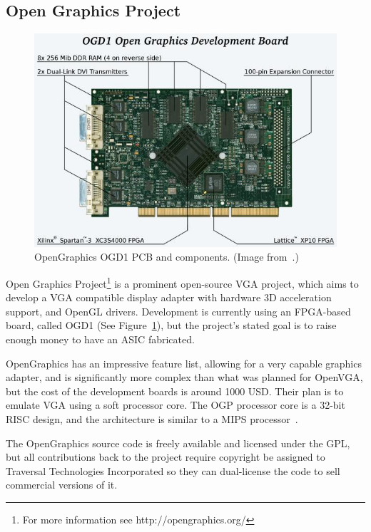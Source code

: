 \subsection{Open Graphics Project}

\begin{figure}[h!]
\begin{center}
\includegraphics[width=\linewidth]{images/ogd1_showcase.jpeg}
\end{center}
\caption[OpenGraphics OGD1]{OpenGraphics OGD1 PCB and components. (Image
from~\cite{OpenGraphics}.)}
\label{INTRO_OGD1}
\end{figure}

Open Graphics Project\footnote{For more information see http://opengraphics.org/}
is a prominent open-source VGA project, which aims to develop a VGA compatible
display adapter with hardware 3D acceleration support, and OpenGL drivers.
Development is currently using an FPGA-based board, called OGD1 (See
Figure~\ref{INTRO_OGD1}), but the project's stated goal is to raise enough money
to have an ASIC fabricated.

OpenGraphics has an impressive feature list, allowing for a very capable graphics
adapter, and is significantly more complex than what was planned for OpenVGA, but
the cost of the development boards is around 1000 USD. Their plan is to emulate
VGA using a soft processor core. The OGP processor core is a 32-bit RISC design,
and the architecture is similar to a MIPS processor~\cite{OpenGraphics}.

The OpenGraphics source code is freely available and licensed under the GPL, but
all contributions back to the project require copyright be assigned to Traversal
Technologies Incorporated so they can dual-license the code to sell commercial
versions of it.

